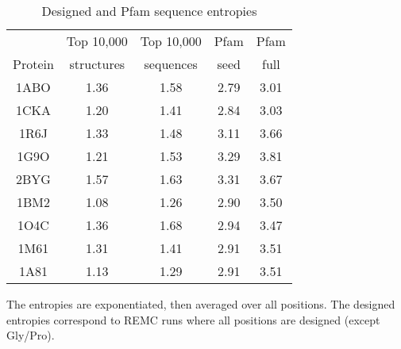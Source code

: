 \begin{table}[!htbp]                            
\caption{Designed and Pfam sequence entropies}
\label{tab:entropy}                      
\begin{center}
\begin{tabular}{ccccc} \hline \hline  
        & Top 10,000 & Top 10,000 & Pfam & Pfam \\
Protein & structures & sequences  & seed & full \\ \hline
1ABO & 1.36 & 1.58 & 2.79 & 3.01 \\
1CKA & 1.20 & 1.41 & 2.84 & 3.03 \\
1R6J & 1.33 & 1.48 & 3.11 & 3.66 \\
1G9O & 1.21 & 1.53 & 3.29 & 3.81 \\
2BYG & 1.57 & 1.63 & 3.31 & 3.67 \\
1BM2 & 1.08 & 1.26 & 2.90 & 3.50 \\
1O4C & 1.36 & 1.68 & 2.94 & 3.47 \\
1M61 & 1.31 & 1.41 & 2.91 & 3.51 \\
1A81 & 1.13 & 1.29 & 2.91 & 3.51 \\ \hline
\end{tabular}
\end{center}
{\small \noindent The entropies are exponentiated, then averaged over all positions.
The designed entropies correspond to REMC runs where all positions are designed (except Gly/Pro).}
\end{table}

\normalsize

\clearpage
\pagebreak




